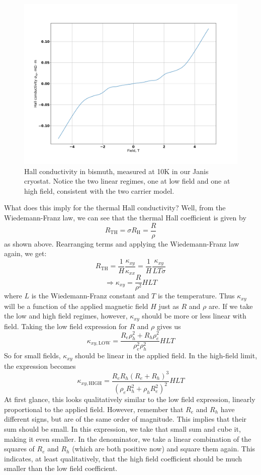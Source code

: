 \documentclass{thesis-umich}
\begin{document}
\begin{figure}
	\caption[Hall conductivity in bismuth]{Hall conductivity in bismuth, measured at 10K in our Janis cryostat. Notice the two linear regimes, one at low field and one at high field, consistent with the two carrier model.}
	\label{fig:bismuth_hall}
	\includegraphics[width=\columnwidth]{figures/BiHallEffect.pdf}
\end{figure}

What does this imply for the thermal Hall conductivity? Well, from the Wiedemann-Franz law, we can see that the thermal Hall coefficient is given by
\[ R_{\mathrm{TH}} = \sigma R_{\mathrm{H}} = \frac{R}{\rho}\]
as shown above. Rearranging terms and applying the Wiedemann-Franz law again, we get:
\[ R_{\mathrm{TH}} = \frac{1}{H}\frac{\kappa_{xy}}{\kappa_{xx}} = \frac{1}{H}\frac{\kappa_{xy}}{LT\sigma}\]
\[ \Rightarrow \kappa_{xy} = \frac{R}{\rho^2}HLT \]
where $L$ is the Wiedemann-Franz constant and $T$ is the temperature. Thus $\kappa_{xy}$ will be a function of the applied magnetic field $H$ just as $R$ and $\rho$ are. If we take the low and high field regimes, however, $\kappa_{xy}$ should be more or less linear with field. Taking the low field expression for $R$ and $\rho$ gives us
\[ \kappa_{xy,\mathrm{LOW}} = \frac{R_e\rho_h^2 + R_h \rho_e^2}{\rho_e^2 \rho_h^2} HLT \]
So for small fields, $\kappa_{xy}$ should be linear in the applied field. In the high-field limit, the expression becomes
\[ \kappa_{xy,\mathrm{HIGH}} = \frac{R_e R_h (R_e + R_h)^3}{(\rho_e R_h^2 + \rho_h R_e^2)^2} HLT \]
At first glance, this looks qualitatively similar to the low field expression, linearly proportional to the applied field. However, remember that $R_e$ and $R_h$ have different signs, but are of the same order of magnitude. This implies that their sum should be small. In this expression, we take that small sum and cube it, making it even smaller. In the denominator, we take a linear combination of the squares of $R_e$ and $R_h$ (which are both positive now) and square them again. This indicates, at least qualitatively, that the high field coefficient should be much smaller than the low field coefficient.
\end{document}
